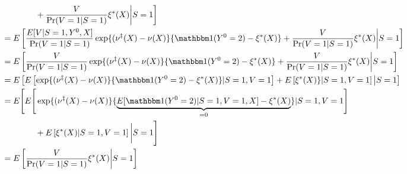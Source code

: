 \documentclass[12pt]{article}
\begin{document}
\begin{appendix}
\begin{align*}
      &\qquad\qquad + \dfrac{V}{\Pr(V=1|S=1)}\xi^*(X)\bigg|S=1 \bigg] \\
      &= E\left[\dfrac{ E[V|S=1,Y^0, X]}{\Pr(V=1|S=1)}\exp\{(\nu^\ddagger(X) - \nu(X)\}\{\mathbbm 1(Y^0 = 2) - \xi^*(X)\} + \dfrac{V}{\Pr(V=1|S=1)}\xi^*(X) \bigg|S=1\right] \\
      &= E\left[\dfrac{V}{\Pr(V=1|S=1)}\exp\{(\nu^\ddagger(X) - \nu(X)\}\{\mathbbm 1(Y^0 = 2) - \xi^*(X)\} + \dfrac{V}{\Pr(V=1|S=1)}\xi^*(X)\bigg|S=1 \right] \\
      &= E\left[E\left[\exp\{(\nu^\ddagger(X) - \nu(X)\}\{\mathbbm 1(Y^0 = 2) - \xi^*(X)\} | S=1, V = 1\right] + E\left[\xi^*(X)\} |S=1, V=1\right] \big| S= 1\right] \\
      &= E\Bigg[E\Bigg[\exp\{(\nu^\ddagger(X) - \nu(X)\}\{\underbrace{ E[\mathbbm1(Y^0 = 2)|S=1,V=1,X] - \xi^*(X)}_{=0}\} | S=1, V = 1\Bigg] \\
      &\qquad\qquad+ E\left[\xi^*(X)|S=1, V=1\right]\bigg|S=1\Bigg] \\
        &= E\left[\dfrac{V}{\Pr(V=1|S=1)}\xi^*(X)\bigg|S=1\right]
\end{align*}


\end{appendix}
\end{document}
